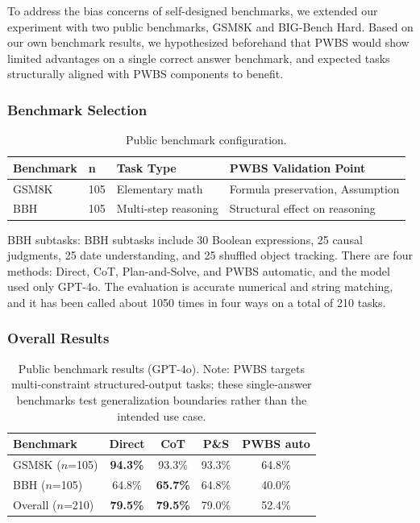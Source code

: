\documentclass[11pt,a4paper]{article}
\begin{document}
To address the bias concerns of self-designed benchmarks, we extended our experiment with two public benchmarks, GSM8K and BIG-Bench Hard. Based on our own benchmark results, we hypothesized beforehand that PWBS would show limited advantages on a single correct answer benchmark, and expected tasks structurally aligned with PWBS components to benefit.

\subsubsection{Benchmark Selection}

\begin{table}[ht]
\centering
\caption{Public benchmark configuration.}
\label{tab:public-config}
\begin{tabular}{llll}
\toprule
\textbf{Benchmark} & \textbf{n} & \textbf{Task Type} & \textbf{PWBS Validation Point} \\
\midrule
GSM8K & 105 & Elementary math & Formula preservation, Assumption \\
BBH & 105 & Multi-step reasoning & Structural effect on reasoning \\
\bottomrule
\end{tabular}
\end{table}

BBH subtasks: BBH subtasks include 30 Boolean expressions, 25 causal judgments, 25 date understanding, and 25 shuffled object tracking. There are four methods: Direct, CoT, Plan-and-Solve, and PWBS automatic, and the model used only GPT-4o. The evaluation is accurate numerical and string matching, and it has been called about 1050 times in four ways on a total of 210 tasks.

\subsubsection{Overall Results}

\begin{table}[ht]
\centering
\caption{Public benchmark results (GPT-4o). Note: PWBS targets multi-constraint structured-output tasks; these single-answer benchmarks test generalization boundaries rather than the intended use case.}
\label{tab:public-results}
\begin{tabular}{lcccc}
\toprule
\textbf{Benchmark} & \textbf{Direct} & \textbf{CoT} & \textbf{P\&S} & \textbf{PWBS auto} \\
\midrule
GSM8K ($n$=105) & \textbf{94.3\%} & 93.3\% & 93.3\% & 64.8\% \\
BBH ($n$=105) & 64.8\% & \textbf{65.7\%} & 64.8\% & 40.0\% \\
\midrule
Overall ($n$=210) & \textbf{79.5\%} & \textbf{79.5\%} & 79.0\% & 52.4\% \\
\bottomrule
\end{tabular}
\end{table}
\end{document}
